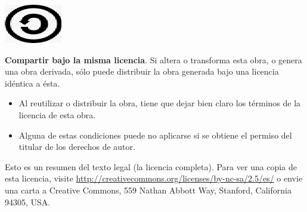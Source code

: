 \begin{center}
{\begin{minipage}{\textwidth}
\begin{minipage}[t]{20mm}
  \vspace*{0mm}\hspace*{1em}
  \includegraphics[scale=0.35]{deed_002.png}
\end{minipage}%
\begin{minipage}[t]{14cm}
  \vspace*{-2mm}
  {\bf Compartir bajo la misma licencia}. Si altera o transforma esta obra, o
  genera una obra derivada, sólo puede distribuir la obra generada bajo una
  licencia idéntica a ésta. 
\end{minipage}

\begin{itemize}    
\item Al reutilizar o distribuir la obra, tiene que dejar bien claro los
  términos de la licencia de esta obra. 
\item Alguna de estas condiciones puede no aplicarse si se obtiene el permiso
 del titular de los derechos de autor.
\end{itemize}
\vspace*{1ex}
\end{minipage}}
\end{center}

\vspace*{4ex}

Esto es un resumen del texto legal (la licencia completa). Para ver una copia
de esta licencia, visite 
\href{http://creativecommons.org/licenses/by-nc-sa/2.5/es/}
     {\url{http://creativecommons.org/licenses/by-nc-sa/2.5/es/}}
o envie una carta a Creative Commons, 559 Nathan Abbott Way, Stanford,
California 94305, USA.

